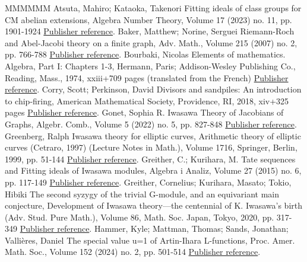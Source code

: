 \begin{thebibliography}{MMMMMM}
 Atsuta, Mahiro; Kataoka, Takenori Fitting ideals of class groups for CM abelian extensions, Algebra Number Theory, Volume 17 (2023) no. 11, pp. 1901-1924 \href{https://alco.centre-mersenne.org/articles/10.5802/alco.355/#AK21}{Publisher reference}.
 Baker, Matthew; Norine, Serguei Riemann-Roch and Abel-Jacobi theory on a finite graph, Adv. Math., Volume 215 (2007) no. 2, pp. 766-788 \href{https://alco.centre-mersenne.org/articles/10.5802/alco.355/#BN07}{Publisher reference}.
 Bourbaki, Nicolas Elements of mathematics. Algebra, Part I: Chapters 1-3, Hermann, Paris; Addison-Wesley Publishing Co., Reading, Mass., 1974, xxiii+709 pages (translated from the French) \href{https://alco.centre-mersenne.org/articles/10.5802/alco.355/#BouAlg74}{Publisher reference}.
 Corry, Scott; Perkinson, David Divisors and sandpiles: An introduction to chip-firing, American Mathematical Society, Providence, RI, 2018, xiv+325 pages \href{https://alco.centre-mersenne.org/articles/10.5802/alco.355/#CP18}{Publisher reference}.
 Gonet, Sophia R. Iwasawa Theory of Jacobians of Graphs, Algebr. Comb., Volume 5 (2022) no. 5, pp. 827-848 \href{https://alco.centre-mersenne.org/articles/10.5802/alco.355/#Gon22}{Publisher reference}.
 Greenberg, Ralph Iwasawa theory for elliptic curves, Arithmetic theory of elliptic curves (Cetraro, 1997) (Lecture Notes in Math.), Volume 1716, Springer, Berlin, 1999, pp. 51-144 \href{https://alco.centre-mersenne.org/articles/10.5802/alco.355/#Gree99}{Publisher reference}.
 Greither, C.; Kurihara, M. Tate sequences and Fitting ideals of Iwasawa modules, Algebra i Analiz, Volume 27 (2015) no. 6, pp. 117-149 \href{https://alco.centre-mersenne.org/articles/10.5802/alco.355/#GK15}{Publisher reference}.
 Greither, Cornelius; Kurihara, Masato; Tokio, Hibiki The second syzygy of the trivial G-module, and an equivariant main conjecture, Development of Iwasawa theory—the centennial of K. Iwasawa’s birth (Adv. Stud. Pure Math.), Volume 86, Math. Soc. Japan, Tokyo, 2020, pp. 317-349 \href{https://alco.centre-mersenne.org/articles/10.5802/alco.355/#GKT20}{Publisher reference}.
 Hammer, Kyle; Mattman, Thomas; Sands, Jonathan; Vallières, Daniel The special value u=1 of Artin-Ihara L-functions, Proc. Amer. Math. Soc., Volume 152 (2024) no. 2, pp. 501-514 \href{https://alco.centre-mersenne.org/articles/10.5802/alco.355/#HMSV24}{Publisher reference}.

\end{thebibliography}
